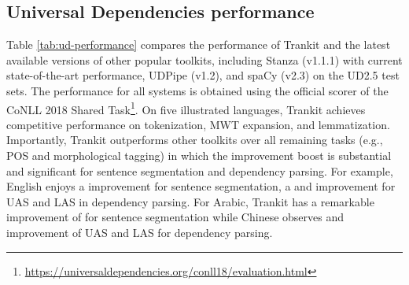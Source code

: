 \documentclass[11pt,a4paper]{article}
\begin{document}
\begin{table*}[ht]
\centering
\addtolength{\belowcaptionskip}{-3mm}
\caption{Model performance on 9 different treebanks (macro-averaged F1 score over test sets).}
\label{tab:ablation}
\end{table*}

\subsection{Universal Dependencies performance}

Table \ref{tab:ud-performance} compares the performance of Trankit and the latest available versions of other popular toolkits, including Stanza (v1.1.1) with current state-of-the-art performance, UDPipe (v1.2), and spaCy (v2.3) on the UD2.5 test sets.  The performance for all systems is obtained using the official scorer of the CoNLL 2018 Shared Task\footnote{\url{https://universaldependencies.org/conll18/evaluation.html}}. On five illustrated languages, Trankit achieves competitive performance on tokenization, MWT expansion, and lemmatization. Importantly, Trankit outperforms other toolkits over all remaining tasks (e.g., POS and morphological tagging) in which the improvement boost is substantial and significant for sentence segmentation and dependency parsing. For example, English enjoys a  improvement for sentence segmentation, a  and  improvement for UAS and LAS in dependency parsing. For Arabic, Trankit has a remarkable improvement of  for sentence segmentation while Chinese observes  and  improvement of UAS and LAS for dependency parsing.
\end{document}
